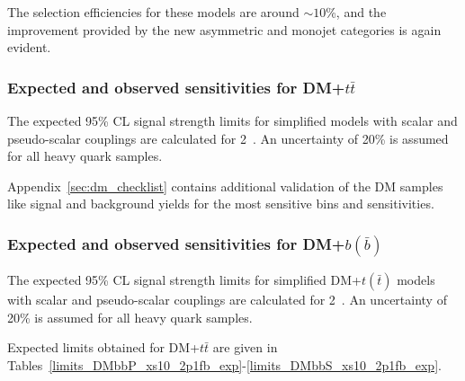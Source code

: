 The selection efficiencies for these models are around $\sim 10$\%, and the improvement
provided by the new asymmetric and monojet categories is again evident.

\clearpage 
%
% 
\clearpage



%
% 
\clearpage


\subsubsection{Expected and observed sensitivities for DM+$t\bar{t}$}

The expected 95\% CL signal strength limits for simplified \DMtt models with scalar and
pseudo-scalar couplings are calculated for 2~\ifb. An uncertainty of 20\% is assumed for all 
heavy quark samples.



\clearpage
%
%



Appendix~\ref{sec:dm_checklist} contains additional validation of the \DMj DM samples like signal and background yields for the most sensitive bins and sensitivities.

\subsubsection{Expected and observed sensitivities for DM+$b(\bar{b})$}

The expected 95\% CL signal strength limits for simplified DM+$t(\bar{t})$ models with scalar and
pseudo-scalar couplings are calculated for 2~\ifb. An uncertainty of 20\% is assumed for all 
heavy quark samples.


\clearpage
Expected limits obtained for DM+$t\bar{t}$ are given in Tables~\ref{limits_DMbbP_xs10_2p1fb_exp}-\ref{limits_DMbbS_xs10_2p1fb_exp}. 

%
%



